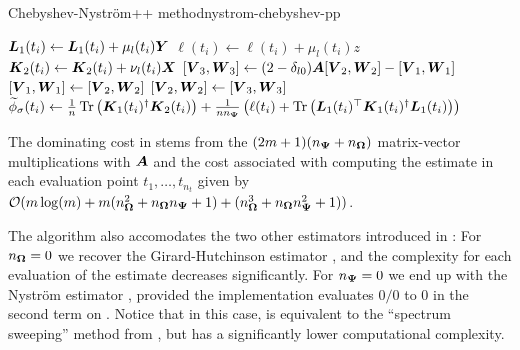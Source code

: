 \begin{algo}{Chebyshev-Nyström++ method}{nystrom-chebyshev-pp}
\begin{algorithmic}[1]
            \State $\boldsymbol{L}_1(t_i) \gets \boldsymbol{L}_1(t_i) + \mu_l(t_i) \boldsymbol{Y}$ 
            \State $\ell(t_i) \gets \ell(t_i) + \mu_l(t_i) z$ 
        \EndIf
        \State $\boldsymbol{K}_2(t_i) \gets \boldsymbol{K}_2(t_i) + \nu_l(t_i) \boldsymbol{X}$ 
      \EndFor
      \State $[\boldsymbol{V}_3, \boldsymbol{W}_3] \gets (2 - \delta_{l0}) \boldsymbol{A} [\boldsymbol{V}_2, \boldsymbol{W}_2] - [\boldsymbol{V}_1, \boldsymbol{W}_1]$ 
      \State $[\boldsymbol{V}_1, \boldsymbol{W}_1] \gets [\boldsymbol{V}_2, \boldsymbol{W}_2]$
      \State $[\boldsymbol{V}_2, \boldsymbol{W}_2] \gets [\boldsymbol{V}_3, \boldsymbol{W}_3]$
    \EndFor
      \State $\widetilde{\phi}_{\sigma}(t_i) \gets \frac{1}{n} \operatorname{Tr}\left( \boldsymbol{K}_1(t_i)^{\dagger}\boldsymbol{K}_2(t_i) \right) + \frac{1}{n n_{\boldsymbol{\Psi}}} \left( \ell(t_i) + \operatorname{Tr}\left( \boldsymbol{L}_1(t_i)^{\top} \boldsymbol{K}_1(t_i)^{\dagger} \boldsymbol{L}_1(t_i) \right)  \right) $ \label{lin:4-nystromchebyshev-nystrom-pp}
    \EndFor
\end{algorithmic}
\end{algo}

The dominating cost in  stems from the $(2m + 1)(n_{\boldsymbol{\Psi}} + n_{\boldsymbol{\Omega}})$ matrix-vector multiplications with $\boldsymbol{A}$ and the cost associated with computing the estimate in each evaluation point $t_1, \dots, t_{n_t}$ given by $\mathcal{O}(m \log(m) + m (n_{\boldsymbol{\Omega}}^2 + n_{\boldsymbol{\Omega}} n_{\boldsymbol{\Psi}} + 1) + (n_{\boldsymbol{\Omega}}^3 + n_{\boldsymbol{\Omega}} n_{\boldsymbol{\Psi}}^2 + 1))$.

The algorithm also accomodates the two other estimators introduced in : For $n_{\boldsymbol{\Omega}} = 0$ we recover the Girard-Hutchinson estimator , and the complexity for each evaluation of the estimate decreases significantly. For $n_{\boldsymbol{\Psi}} = 0$ we end up with the Nyström estimator , provided the implementation evaluates $0/0$ to $0$ in the second term on . Notice that in this case,  is equivalent to the \enquote{spectrum sweeping} method from \cite[algorithm 5]{lin-2017-randomized-estimation}, but has a significantly lower computational complexity.

